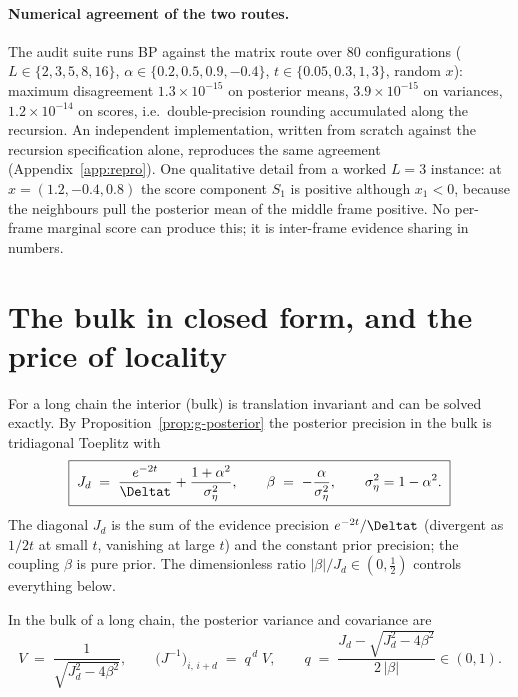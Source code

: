 \paragraph{Numerical agreement of the two routes.} The audit suite runs BP
against the matrix route over $80$ configurations
($L \in \{2,3,5,8,16\}$, $\alpha \in \{0.2, 0.5, 0.9, -0.4\}$,
$t \in \{0.05, 0.3, 1, 3\}$, random $x$): maximum disagreement
$1.3 \times 10^{-15}$ on posterior means, $3.9 \times 10^{-15}$ on
variances, $1.2 \times 10^{-14}$ on scores, i.e.\ double-precision
rounding accumulated along the recursion. An independent implementation,
written from scratch against the recursion specification alone,
reproduces the same agreement (Appendix~\ref{app:repro}). One qualitative
detail from a worked $L = 3$ instance: at $x = (1.2, -0.4, 0.8)$ the score
component $S_1$ is positive although $x_1 < 0$, because the neighbours
pull the posterior mean of the middle frame positive. No per-frame
marginal score can produce this; it is inter-frame evidence sharing in
numbers.

\section{The bulk in closed form, and the price of locality}
\label{sec:g-bulk}\label{sec:g-locality}\label{sec:bp-truncation}

For a long chain the interior (bulk) is translation invariant and can be
solved exactly. By Proposition~\ref{prop:g-posterior} the posterior
precision in the bulk is tridiagonal Toeplitz with
\begin{equation}
  \boxed{\;
  J_d \;=\; \frac{e^{-2t}}{\Deltat} + \frac{1+\alpha^2}{\sigma_\eta^2},
  \qquad
  \beta \;=\; -\frac{\alpha}{\sigma_\eta^2},
  \qquad \sigma_\eta^2 = 1 - \alpha^2 .
  \;}
  \label{eq:g-bulk-params}
\end{equation}
The diagonal $J_d$ is the sum of the evidence precision $e^{-2t}/\Deltat$
(divergent as $1/2t$ at small $t$, vanishing at large $t$) and the
constant prior precision; the coupling $\beta$ is pure prior. The
dimensionless ratio $|\beta|/J_d \in (0, \tfrac{1}{2})$ controls
everything below.

\begin{theorem}
\label{thm:g-bulk-cov}
In the bulk of a long chain, the posterior variance and covariance are
\begin{equation}
  \boxed{\;
  V \;=\; \frac{1}{\sqrt{J_d^2 - 4\beta^2}},
  \qquad
  \big( J^{-1} \big)_{i,\, i+d} \;=\; q^{\,d}\; V,
  \qquad
  q \;=\; \frac{J_d - \sqrt{J_d^2 - 4\beta^2}}{2\,|\beta|} \in (0, 1).
  \;}
  \label{eq:g-bulk-cov}
\end{equation}
\end{theorem}

